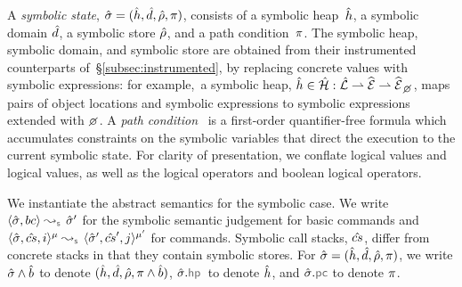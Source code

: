 A \emph{symbolic state}, $\hat{\sigma} = (\hat{h}, \hat{d}, \hat\rho, \pi)$, consists of a 
symbolic heap~$\hat{h}$, a symbolic domain $\hat{d}$, a symbolic store $\hat\rho$, and a path condition~$\pi$. 
The symbolic heap, symbolic domain, and symbolic store are obtained from their instrumented 
counterparts of~\S\ref{subsec:instrumented}, by replacing concrete values with symbolic expressions: for example,~a symbolic heap, $\sheap \in \sheaps : \slocs \partialmap \sexprs \partialmap \setext{\sexprs}{\none}$,
 maps pairs of object locations and symbolic expressions to symbolic expressions
extended with $\none$. 
A \emph{path condition}~\cite{symb:exec:survey} is a first-order quantifier-free formula which
 accumulates constraints on the symbolic variables that direct 
the execution to the current symbolic state.
For clarity of presentation, we conflate \jsil logical values and logical values, as well as the \jsil logical operators and boolean logical operators.

We instantiate the abstract semantics for the symbolic case.  
We write $\absbsemrule{\sstate, \bcmd}{\sstate'}{\symbolic}$ for the symbolic semantic 
judgement for basic commands and $\abssemrule{\sstate, \scs, i}{\sstate', \scs', j}{\mode}{\mode'}{\symbolic}$ 
for commands. Symbolic call stacks, $\hat{cs}$, differ from concrete stacks in that they contain symbolic stores.
For $\hat{\sigma} = (\hat{h}, \hat{d}, \hat\rho, \pi)$, we write $\hat{\sigma} \wedge \hat{b}$ to denote $(\hat{h}, \hat{d}, \hat\rho, \pi \wedge \hat{b})$, 
$\sstate.\hpsel$ to denote $\hat{h}$, and $\sstate.\pcsel\!$ to denote $\pi$.



